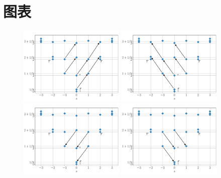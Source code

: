 \appendix

\chapter{图表}

\begin{figure}[ht]
  \vspace{-1.5cm}
  \centering
  \includegraphics[width=0.45\textwidth]{images/virasoro/ising-lm1.pdf}    \quad
  \includegraphics[width=0.45\textwidth]{images/virasoro/ising-lbarm1.pdf} \\
  \includegraphics[width=0.45\textwidth]{images/virasoro/ising-l1.pdf}     \quad
  \includegraphics[width=0.45\textwidth]{images/virasoro/ising-lbar1.pdf}  \\

\end{figure}
